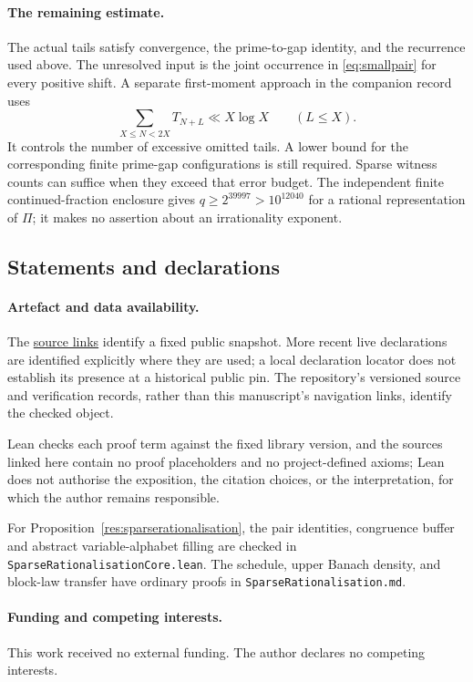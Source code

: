 \documentclass[11pt]{article}
\begin{document}
\paragraph{The remaining estimate.}
The actual tails satisfy convergence, the prime-to-gap identity, and the
recurrence used above.  The unresolved input is the joint occurrence in
\eqref{eq:smallpair} for every positive shift.  A separate first-moment
approach in the companion record uses
\[
 \sum_{X\le N<2X}T_{N+L}\ll X\log X\qquad(L\le X).
\]
It controls the number of excessive omitted tails.  A lower bound for the
corresponding finite prime-gap configurations is still required.  Sparse
witness counts can suffice when they exceed that error budget.
The independent finite continued-fraction enclosure gives
$q\ge2^{39997}>10^{12040}$ for a rational representation of $\Pi$; it makes
no assertion about an irrationality exponent.

\subsection*{Statements and declarations}

\paragraph{Artefact and data availability.} The
\href{\sourceurl}{source links} identify a fixed public snapshot.
More recent live declarations are identified explicitly where they are used;
a local declaration locator does not establish its presence at a historical
public pin.  The repository's versioned source and verification records,
rather than this manuscript's navigation links, identify the checked object.

Lean checks each proof term against the fixed library
version, and the sources linked here contain no proof placeholders and no
project-defined axioms; Lean does not authorise the exposition, the citation
choices, or the interpretation, for which the author remains responsible.

For Proposition~\ref{res:sparserationalisation}, the pair identities,
congruence buffer and abstract variable-alphabet filling are checked in
\texttt{SparseRationalisationCore.lean}.  The schedule, upper Banach density,
and block-law transfer have ordinary proofs in
\texttt{SparseRationalisation.md}.

\paragraph{Funding and competing interests.} This work received no external
funding.  The author declares no competing interests.
\end{document}
